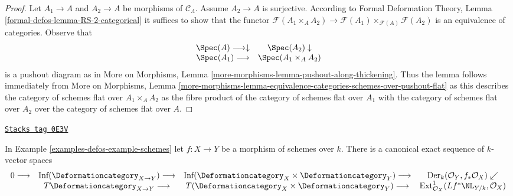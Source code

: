 \begin{proof}
Let $A_1 \to A$ and $A_2 \to A$ be morphisms of $\mathcal{C}_\Lambda$.
Assume $A_2 \to A$ is surjective. According to
Formal Deformation Theory, Lemma
\ref{formal-defos-lemma-RS-2-categorical}
it suffices to show that the functor
$\mathcal{F}(A_1 \times_A A_2) \to
\mathcal{F}(A_1) \times_{\mathcal{F}(A)} \mathcal{F}(A_2)$
is an equivalence of categories.
Observe that
$$
\begin{array}{cc}\Spec(A) \longrightarrow\downarrow & \Spec(A_2) \downarrow \\ \Spec(A_1) \longrightarrow & \Spec(A_1 \times_A A_2)\end{array}
$$
is a pushout diagram as in More on Morphisms, Lemma
\ref{more-morphisms-lemma-pushout-along-thickening}.
Thus the lemma follows immediately from
More on Morphisms, Lemma
\ref{more-morphisms-lemma-equivalence-categories-schemes-over-pushout-flat}
as this describes the category of schemes flat over $A_1 \times_A A_2$
as the fibre product of the category of schemes flat over $A_1$
with the category of schemes flat over $A_2$ over the category of
schemes flat over $A$.
\end{proof}

\begin{lemma}
\label{examples-defos-lemma-schemes-morphisms-TI}
\href{https://stacks.math.columbia.edu/tag/0E3V}{\texttt{Stacks tag 0E3V}}

In Example \ref{examples-defos-example-schemes} let $f : X \to Y$ be a morphism of schemes
over $k$. There is a canonical exact sequence of $k$-vector spaces
$$
\begin{array}{cccc}0 \longrightarrow & \text{Inf}(\Deformationcategory_{X \to Y}) \longrightarrow & \text{Inf}(\Deformationcategory_X \times \Deformationcategory_Y) \longrightarrow & \text{Der}_k(\mathcal{O}_Y, f_*\mathcal{O}_X) \swarrow \\  & T\Deformationcategory_{X \to Y} \longrightarrow & T(\Deformationcategory_X \times \Deformationcategory_Y) \longrightarrow & \text{Ext}^1_{\mathcal{O}_X}(Lf^*\NL_{Y/k}, \mathcal{O}_X)\end{array}
$$
\end{lemma}

